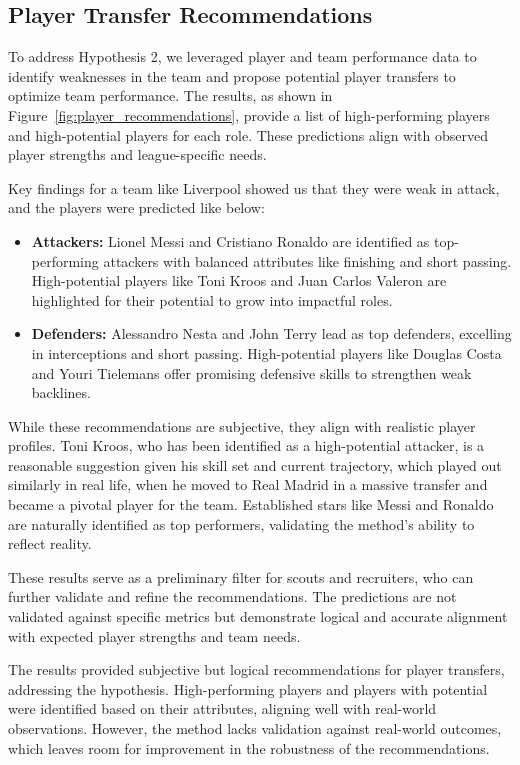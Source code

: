 \documentclass{article}
\begin{document}
\subsection{Player Transfer Recommendations}

To address Hypothesis 2, we leveraged player and team performance data to identify weaknesses in the team and propose potential player transfers to optimize team performance. The results, as shown in Figure~\ref{fig:player_recommendations}, provide a list of high-performing players and high-potential players for each role. These predictions align with observed player strengths and league-specific needs.

Key findings for a team like Liverpool showed us that they were weak in attack, and the players were predicted like below:
\begin{itemize}
    \item \textbf{Attackers:} Lionel Messi and Cristiano Ronaldo are identified as top-performing attackers with balanced attributes like finishing and short passing. High-potential players like Toni Kroos and Juan Carlos Valeron are highlighted for their potential to grow into impactful roles.
    \item \textbf{Defenders:} Alessandro Nesta and John Terry lead as top defenders, excelling in interceptions and short passing. High-potential players like Douglas Costa and Youri Tielemans offer promising defensive skills to strengthen weak backlines.
\end{itemize}
While these recommendations are subjective, they align with realistic player profiles. Toni Kroos, who has been identified as a high-potential attacker, is a reasonable suggestion given his skill set and current trajectory, which played out similarly in real life, when he moved to Real Madrid in a massive transfer and became a pivotal player for the team. Established stars like Messi and Ronaldo are naturally identified as top performers, validating the method's ability to reflect reality.

These results serve as a preliminary filter for scouts and recruiters, who can further validate and refine the recommendations. The predictions are not validated against specific metrics but demonstrate logical and accurate alignment with expected player strengths and team needs.

The results provided subjective but logical recommendations for player transfers, addressing the hypothesis. High-performing players and players with potential were identified based on their attributes, aligning well with real-world observations. However, the method lacks validation against real-world outcomes, which leaves room for improvement in the robustness of the recommendations.
\end{document}
